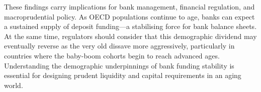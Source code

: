 \documentclass[12pt,a4paper]{article}
\begin{document}
These findings carry implications for bank management, financial regulation, and macroprudential policy. As OECD populations continue to age, banks can expect a sustained supply of deposit funding---a stabilising force for bank balance sheets. At the same time, regulators should consider that this demographic dividend may eventually reverse as the very old dissave more aggressively, particularly in countries where the baby-boom cohorts begin to reach advanced ages. Understanding the demographic underpinnings of bank funding stability is essential for designing prudent liquidity and capital requirements in an aging world.


\newpage

\end{document}
